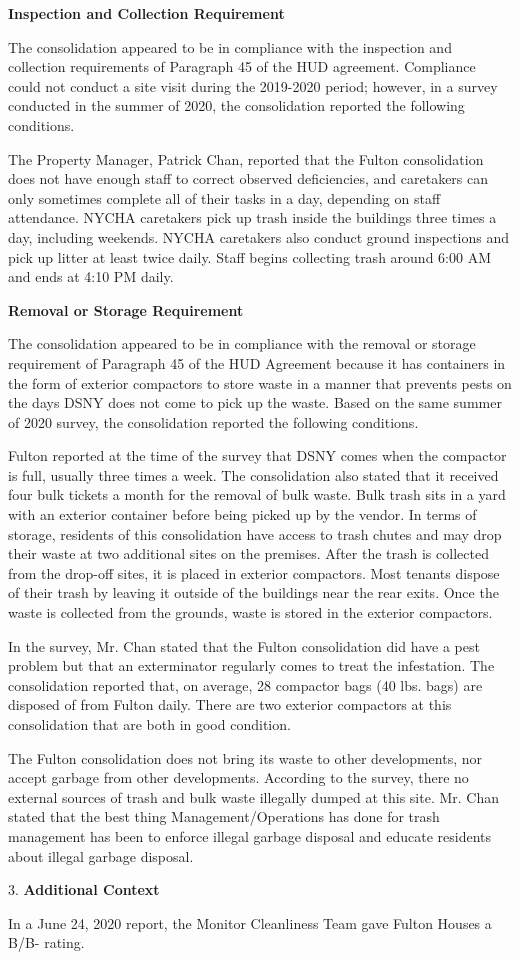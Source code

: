 
\textbf{Inspection and Collection Requirement}

The consolidation appeared to be in compliance with the inspection and collection requirements of Paragraph 45 of the HUD agreement. Compliance could not conduct a site visit during the 2019-2020 period; however, in a survey conducted in the summer of 2020, the consolidation reported the following conditions.

The Property Manager, Patrick Chan, reported that the Fulton consolidation does not have enough staff to correct observed deficiencies, and caretakers can only sometimes complete all of their tasks in a day, depending on staff attendance. NYCHA caretakers pick up trash inside the buildings three times a day, including weekends. NYCHA caretakers also conduct ground inspections and pick up litter at least twice daily. Staff begins collecting trash around 6:00 AM and ends at 4:10 PM daily.

\textbf{Removal or Storage Requirement}

The consolidation appeared to be in compliance with the removal or storage requirement of Paragraph  45 of the HUD Agreement because it has containers in the form of exterior compactors to store waste in a manner that prevents pests on the days DSNY does not come to pick up the waste. Based on the same summer of  2020 survey, the consolidation reported the following conditions.

Fulton reported at the time of the survey that DSNY comes when the compactor is full, usually three times a week. The consolidation also stated that it received four bulk tickets a month for the removal of bulk waste. Bulk trash sits in a yard with an exterior container before being picked up by the vendor. In terms of storage, residents of this consolidation have access to trash chutes and may drop their waste at two additional sites on the premises. After the trash is collected from the drop-off sites, it is placed in exterior compactors. Most tenants dispose of their trash by leaving it outside of the buildings near the rear exits. Once the waste is collected from the grounds, waste is stored in the exterior compactors. 

In the survey, Mr. Chan stated that the Fulton consolidation did have a pest problem but that an exterminator regularly comes to treat the infestation. The consolidation reported that, on average, 28 compactor bags (40 lbs. bags) are disposed of from Fulton daily. There are two exterior compactors at this consolidation that are both in good condition. 

The Fulton consolidation does not bring its waste to other developments, nor accept garbage from other developments. According to the survey, there no external sources of trash and bulk waste illegally dumped at this site. Mr. Chan stated that the best thing Management/Operations has done for trash management has been to enforce illegal garbage disposal and educate residents about illegal garbage disposal. 

3. \textbf{Additional Context} 

In a June 24, 2020 report, the Monitor Cleanliness Team gave Fulton Houses a B/B- rating. 